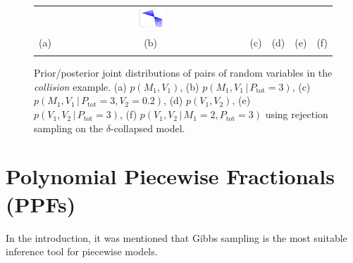 \documentclass[letterpaper]{article}
\newcommand{\pr}{p}
\newcommand{\nn}{0.16}
\begin{document}
\begin{figure}
\begin{center}
\begin{tabular}{cccccc}
& \hspace{-3mm} \includegraphics[width=\nn\textwidth]{Figs/colV1V2givenPis3M1is2.png}
\vspace{-1.5mm}
\\
   \hspace{-5mm} \footnotesize(a) 
& \hspace{-4mm} \footnotesize(b) 
& \hspace{-3mm} \footnotesize(c) 
&\hspace{-1mm} \footnotesize(d) 
&\hspace{-1mm} \footnotesize(e) 
&\hspace{-1mm} \footnotesize(f)\\
\multicolumn{6}{c}{}
\end{tabular}
\end{center}
\vspace{-8mm}
\caption{\footnotesize
Prior/posterior joint distributions of pairs of random variables in the \emph{collision} example. 
(a) $\pr(M_1, V_1)$,
(b) $\pr(M_1, V_1 \, | \, P_\text{tot} = 3)$,
(c) $\pr(M_1, V_1 \, | \, P_\text{tot} = 3, V_2 = 0.2)$,
(d) $\pr(V_1, V_2)$,
(e) $\pr(V_1, V_2 \, | \, P_\text{tot} = 3)$,
(f) $\pr(V_1, V_2 \, | \, M_1 =2, P_\text{tot} = 3)$
using rejection sampling on the $\delta$-collapsed model.
} 
\label{fig:mom}
\end{figure}




\section{Polynomial Piecewise Fractionals 
(PPFs)}
\label{sect:ppfs}
In the introduction, it was mentioned that Gibbs sampling is the most suitable inference tool for piecewise models.
\end{document}

